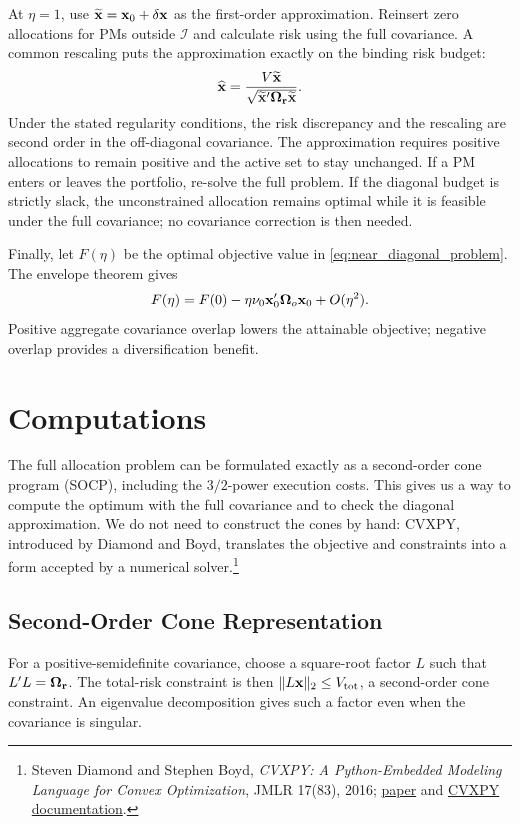 \documentclass[11pt]{gappyarticle}
\begin{document}
At $\eta=1$, use $\widetilde{{\mathbf{x}}}={\mathbf{x}}_0+\delta{\mathbf{x}}$ as the first-order
approximation. Reinsert zero allocations for PMs outside $\mathcal I$ and
calculate risk using the full covariance. A common rescaling puts the
approximation exactly on the binding risk budget:
\begin{align}
    \widehat{{\mathbf{x}}}
       =\frac{V\widetilde{{\mathbf{x}}}}
          {\sqrt{\widetilde{{\mathbf{x}}}'{\boldsymbol{\Omega}}_{\mathbf{r}}
                                      \widetilde{{\mathbf{x}}}}}.
\end{align}
Under the stated regularity conditions, the risk discrepancy and the
rescaling are second order in the off-diagonal covariance. The approximation
requires positive allocations to remain positive and the active set to stay
unchanged. If a PM enters or leaves the portfolio, re-solve the full
problem. If the diagonal budget is strictly slack, the unconstrained
allocation remains optimal while it is feasible under the full covariance;
no covariance correction is then needed.

Finally, let $F(\eta)$ be the optimal objective value in
\eqref{eq:near_diagonal_problem}. The envelope theorem gives
\begin{align}
    F(\eta)=F(0)-\eta\nu_0{\mathbf{x}}_0'{\boldsymbol{\Omega}}_o{\mathbf{x}}_0+O(\eta^2).
\end{align}
Positive aggregate covariance overlap lowers the attainable objective;
negative overlap provides a diversification benefit.

\section{Computations}
\label{sec:computations}
The full allocation problem can be formulated exactly as a second-order
cone program (SOCP), including the $3/2$-power execution costs. This gives
us a way to compute the optimum with the full covariance and to check the
diagonal approximation. We do not need to construct the cones by hand:
CVXPY, introduced by Diamond and Boyd, translates the objective and
constraints into a form accepted by a numerical solver.\footnote{Steven
Diamond and Stephen Boyd, \emph{CVXPY: A Python-Embedded Modeling Language
for Convex Optimization}, JMLR 17(83), 2016;
\href{https://web.stanford.edu/~boyd/papers/cvxpy_paper.html}{paper}
and \href{https://www.cvxpy.org/tutorial/dcp/index.html}{CVXPY documentation}.}

\subsection{Second-Order Cone Representation}
For a positive-semidefinite covariance, choose a square-root factor
$L$ such that $L' L={\boldsymbol{\Omega}}_{\mathbf{r}}$. The total-risk constraint is
then $\|L{\mathbf{x}}\|_2\leq V_{\mathrm{tot}}$, a second-order cone constraint.
An eigenvalue decomposition gives such a factor even when the covariance
is singular.
\end{document}
